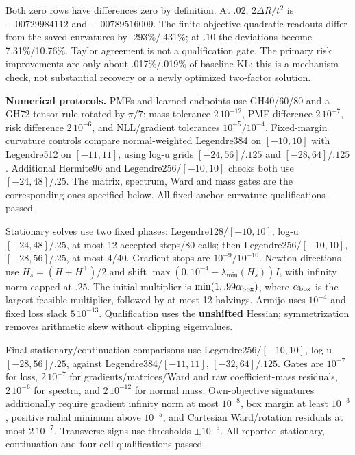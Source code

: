 \documentclass{article}
\begin{document}
Both zero rows have differences zero by definition. At \(.02\),
\(2\Delta R/t^2\) is \(−.00729984112\) and \(−.00789516009\). The
finite-objective quadratic readouts differ from the saved curvatures by
.293\%/.431\%; at \(.10\) the deviations become 7.31\%/10.76\%. Taylor
agreement is not a qualification gate. The primary risk improvements are
only about .017\%/.019\% of baseline KL: this is a mechanism check, not
substantial recovery or a newly optimized two-factor solution.

\textbf{Numerical protocols.} PMFs and learned endpoints use GH40/60/80
and a GH72 tensor rule rotated by \(\pi/7\): mass tolerance
\(2\,10^{-12}\), PMF difference \(2\,10^{-7}\), risk difference
\(2\,10^{-6}\), and NLL/gradient tolerances \(10^{-5}/10^{-4}\).
Fixed-margin curvature controls compare normal-weighted Legendre384 on
\([-10,10]\) with Legendre512 on \([-11,11]\), using log-u grids
\([-24,56]/.125\) and \([-28,64]/.125\). Additional Hermite96 and
Legendre256/\([-10,10]\) checks both use \([-24,48]/.25\). The matrix,
spectrum, Ward and mass gates are the corresponding ones specified
below. All fixed-anchor curvature qualifications passed.

Stationary solves use two fixed phases: Legendre128/\([-10,10]\), log-u
\([-24,48]/.25\), at most 12 accepted steps/80 calls; then
Legendre256/\([-10,10]\), \([-28,56]/.25\), at most 4/40. Gradient stops
are \(10^{-9}/10^{-10}\). Newton directions use \(H_s=(H+H^\top)/2\) and
shift \(\max(0,10^{-4}-\lambda_{\min}(H_s))I\), with infinity norm
capped at \(.25\). The initial multiplier is
\(\min(1,.99\alpha_{\rm box})\), where \(\alpha_{\rm box}\) is the
largest feasible multiplier, followed by at most 12 halvings. Armijo
uses \(10^{-4}\) and fixed loss slack \(5\,10^{-13}\). Qualification
uses the \textbf{unshifted} Hessian; symmetrization removes arithmetic
skew without clipping eigenvalues.

Final stationary/continuation comparisons use Legendre256/\([-10,10]\),
log-u \([-28,56]/.25\), against Legendre384/\([-11,11]\),
\([-32,64]/.125\). Gates are \(10^{-7}\) for loss, \(2\,10^{-7}\) for
gradients/matrices/Ward and raw coefficient-mass residuals,
\(2\,10^{-6}\) for spectra, and \(2\,10^{-12}\) for normal mass.
Own-objective signatures additionally require gradient infinity norm at
most \(10^{-8}\), box margin at least \(10^{-3}\), positive radial
minimum above \(10^{-5}\), and Cartesian Ward/rotation residuals at most
\(2\,10^{-7}\). Transverse signs use thresholds \(\pm10^{-5}\). All
reported stationary, continuation and four-cell qualifications passed.
\end{document}
